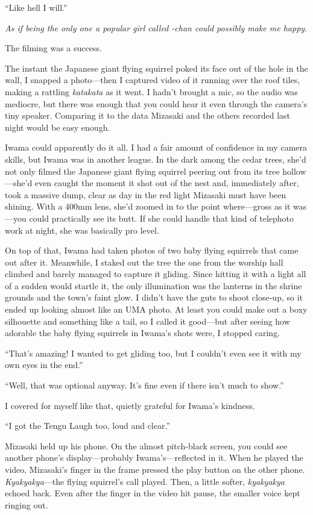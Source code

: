 \documentclass[
    a4paper,
    12pt,
    twoside,
    openany,
    UTF8,
    fontset=windows
]{ctexbook}
\begin{document}
``Like hell I will.''

\textit{As if being the only one a popular girl called -chan could possibly make me happy.}

The filming was a success.

The instant the Japanese giant flying squirrel poked its face out of the hole in the wall, I snapped a photo---then I captured video of it running over the roof tiles, making a rattling \textit{katakata} as it went. I hadn't brought a mic, so the audio was mediocre, but there was enough that you could hear it even through the camera's tiny speaker. Comparing it to the data Mizasaki and the others recorded last night would be easy enough.

Iwama could apparently do it all. I had a fair amount of confidence in my camera skills, but Iwama was in another league. In the dark among the cedar trees, she'd not only filmed the Japanese giant flying squirrel peering out from its tree hollow---she'd even caught the moment it shot out of the nest and, immediately after, took a massive dump, clear as day in the red light Mizasaki must have been shining. With a 400mm lens, she'd zoomed in to the point where---gross as it was---you could practically see its butt. If she could handle that kind of telephoto work at night, she was basically pro level.

On top of that, Iwama had taken photos of two baby flying squirrels that came out after it. Meanwhile, I staked out the tree the one from the worship hall climbed and barely managed to capture it gliding. Since hitting it with a light all of a sudden would startle it, the only illumination was the lanterns in the shrine grounds and the town's faint glow. I didn't have the guts to shoot close-up, so it ended up looking almost like an UMA photo. At least you could make out a boxy silhouette and something like a tail, so I called it good---but after seeing how adorable the baby flying squirrels in Iwama's shots were, I stopped caring.

``That's amazing! I wanted to get gliding too, but I couldn't even see it with my own eyes in the end.''

``Well, that was optional anyway. It's fine even if there isn't much to show.''

I covered for myself like that, quietly grateful for Iwama's kindness.

``I got the Tengu Laugh too, loud and clear.''

Mizasaki held up his phone. On the almost pitch-black screen, you could see another phone's display---probably Iwama's---reflected in it. When he played the video, Mizasaki's finger in the frame pressed the play button on the other phone. \textit{Kyakyakya}---the flying squirrel's call played. Then, a little softer, \textit{kyakyakya} echoed back. Even after the finger in the video hit pause, the smaller voice kept ringing out.
\end{document}
